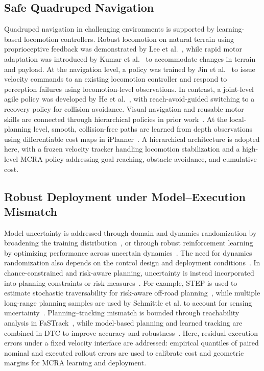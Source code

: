 \documentclass[conference]{IEEEtran}
\begin{document}
\subsection{Safe Quadruped Navigation}
Quadruped navigation in challenging environments is supported by
learning-based locomotion controllers. Robust locomotion on natural terrain
using proprioceptive feedback was demonstrated by Lee et al.~\cite{lee2020},
while rapid motor adaptation was introduced by Kumar et al.~\cite{kumar2021}
to accommodate changes in terrain and payload. At the navigation level, a policy
was trained by Jin et al.~\cite{jin2023resilient} to issue velocity commands to an
existing locomotion controller and respond to perception failures using
locomotion-level observations. In contrast, a joint-level agile policy was
developed by He et al.~\cite{he2024abs}, with reach-avoid-guided switching to a
recovery policy for collision avoidance. Visual navigation and reusable motor
skills are connected through hierarchical policies in prior
work~\cite{jain2021pixels,hoeller2024}. At the local-planning level, smooth,
collision-free paths are learned from depth observations using differentiable
cost maps in iPlanner~\cite{yang2023iplanner}. A hierarchical architecture is
adopted here, with a frozen velocity tracker handling
locomotion stabilization and a high-level MCRA policy addressing goal reaching,
obstacle avoidance, and cumulative cost.

\subsection{Robust Deployment under Model--Execution Mismatch}
Model uncertainty is addressed through domain and dynamics randomization by
broadening the training distribution~\cite{tobin2017,tan2018simreal},
or through robust reinforcement learning by optimizing performance across uncertain
dynamics~\cite{smirnova2019,wang2021,liu2022drql}. The need for dynamics randomization
also depends on the control design and deployment conditions~\cite{xie2021randomization}.
In chance-constrained and risk-aware planning, uncertainty is instead incorporated
into planning constraints or risk measures~\cite{theurkauf2023,fan2021step,schmittle2024}. For example, STEP
is used to estimate stochastic traversability for risk-aware off-road
planning~\cite{fan2021step}, while multiple long-range planning samples are used by Schmittle et al.
to account for sensing uncertainty~\cite{schmittle2024}.
Planning--tracking mismatch is bounded through reachability analysis in
FaSTrack~\cite{herbert2017fastrack}, while model-based planning and learned tracking
are combined in DTC to improve accuracy and robustness~\cite{jenelten2024dtc}.
Here, residual execution errors under a fixed velocity interface are addressed:
empirical quantiles of paired nominal and executed rollout errors are
used to calibrate cost and geometric margins for MCRA learning and deployment.
\end{document}
